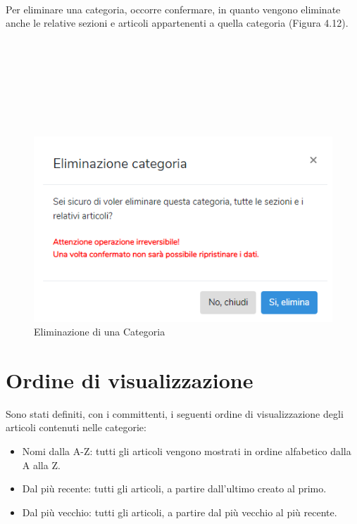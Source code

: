 \documentclass[twoside]{supsistudent}
\begin{document}
\\
Per eliminare una categoria, occorre confermare, in quanto vengono eliminate anche le relative sezioni e articoli appartenenti a quella categoria (Figura 4.12).\\\\\\\\\\\\\\\\
\begin{figure}[!h]
\centering
\includegraphics[scale=0.6]{saniwiki_eliminacategoria.png}
\caption{Eliminazione di una Categoria}
\end{figure}

\section{Ordine di visualizzazione}
Sono stati definiti, con i committenti, i seguenti ordine di visualizzazione degli articoli contenuti nelle categorie:\\
\begin{itemize}
\item Nomi dalla A-Z: tutti gli articoli vengono mostrati in ordine alfabetico dalla A alla Z.\\
\item Dal più recente: tutti gli articoli, a partire dall'ultimo creato al primo.\\
\item Dal più vecchio: tutti gli articoli, a partire dal più vecchio al più recente.\\
\end{itemize}
\end{document}
